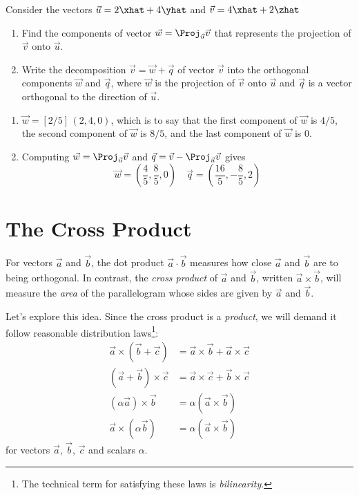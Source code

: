 \begin{exercises}
\begin{problist}
		\prob[\openstax]	Consider the vectors $\vec{u} = 2\xhat + 4\yhat$ and $\vec{v} = 4\xhat + 2\zhat$
			\begin{enumerate}
				\item	Find the components of vector $\vec{w} = \Proj_{\vec{u}}\vec{v}$
					that represents the projection of $\vec{v}$ onto $\vec{u}$.
				\item	Write the decomposition $\vec{v} = \vec{w} + \vec{q}$ of vector
					$\vec{v}$ into the orthogonal components $\vec{w}$ and
					$\vec{q}$, where $\vec{w}$ is the projection of $\vec{v}$ onto
					$\vec{u}$ and $\vec{q}$ is a vector orthogonal to the direction
					of $\vec{u}$.
			\end{enumerate}
            \begin{solution}
                \begin{enumerate}
                    \item   $\vec{w} = [2/5] \, (2,4,0)$, which is to say that the first component of
                        $\vec{w}$ is $4/5$, the second component of $\vec{w}$ is $8/5$, and the last
                        component of $\vec{w}$ is $0$.
                    \item   Computing $\vec{w} = \Proj_{\vec{u}}\vec{v}$ and $\vec{q} = \vec{v} -
                        \Proj_{\vec{u}}\vec{v}$ gives
                        \[
                            \vec{w} = \left( \frac{4}{5}, \frac{8}{5}, 0 \right) \quad
                            \vec{q} = \left( \frac{16}{5}, -\frac{8}{5}, 2 \right)
                        \]
                \end{enumerate}
            \end{solution}
	\end{problist}
\end{exercises}

\section{The Cross Product}

For vectors $\vec a$ and $\vec b$, the dot product $\vec a\cdot \vec b$ measures
how close $\vec a$ and $\vec b$ are to being orthogonal.  In contrast,
the \emph{cross product} of $\vec a$ and $\vec b$,
written $\vec a\times \vec b$, will
measure the \emph{area} of the parallelogram whose sides are given by $\vec a$ and
$\vec b$.

Let's explore this idea.  Since the cross product is a \emph{product}, we will
demand it follow reasonable distribution laws\footnote{ The technical term
for satisfying these laws is \emph{bilinearity}.}:
\begin{align*}
	\vec a\times (\vec b+\vec c) &= \vec a\times \vec b+\vec a\times\vec c\\
	(\vec a+\vec b)\times\vec c &= \vec a\times \vec c+\vec b\times \vec c\\
	(\alpha\vec a)\times \vec b &= \alpha(\vec a\times \vec b)\\
	\vec a\times(\alpha \vec b) &= \alpha(\vec a\times \vec b)
\end{align*}
for vectors $\vec a$, $\vec b$, $\vec c$ and scalars $\alpha$.

